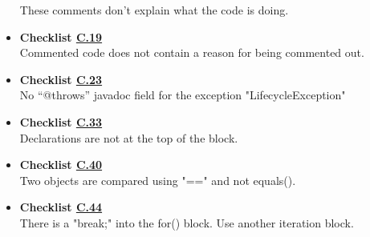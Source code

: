 \documentclass[../../../../codeInspection.tex]{subfiles}
\begin{document}
\begin{itemize}
		    	  These comments don't explain what the code is doing.

		    \item \textbf{Checklist \hyperref[C:19]{C.19}} \\

		    	  

		    	  

		    	  

		    	  Commented code does not contain a reason for being commented out.

		    \item \textbf{Checklist \hyperref[C:23]{C.23}} \\

		          

		          No “@throws” javadoc field for the exception "LifecycleException"

		    \item \textbf{Checklist \hyperref[C:33]{C.33}} \\

		    	  

		    	  Declarations are not at the top of the block.

		    \item \textbf{Checklist \hyperref[C:40]{C.40}} \\

		          

		          Two objects are compared using "==" and not equals().

		    \item \textbf{Checklist \hyperref[C:44]{C.44}} \\

		          

		          There is a "break;" into the for() block. Use another iteration block.


\end{itemize}
\end{document}
